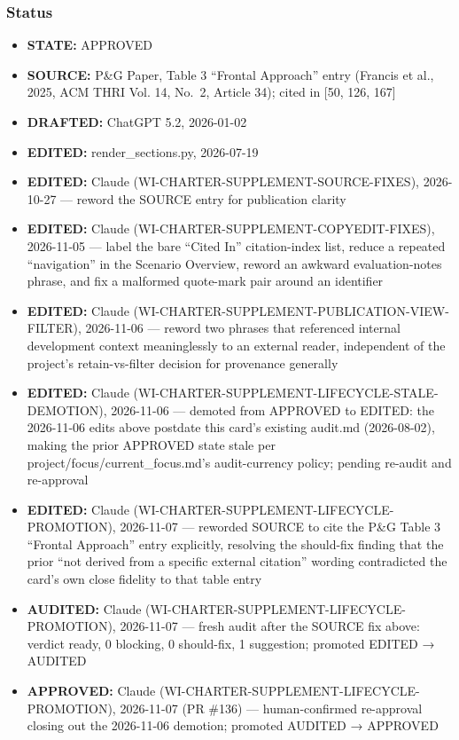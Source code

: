 \documentclass[utf8]{frontiers_suppmat} %
\providecommand{\tightlist}{%
  \setlength{\itemsep}{0pt}\setlength{\parskip}{0pt}}
\begin{document}
\subsubsection{Status}\label{status}

\begin{itemize}
\tightlist
\item
  \textbf{STATE:} APPROVED
\item
  \textbf{SOURCE:} P\&G Paper, Table 3 ``Frontal Approach'' entry
  (Francis et al., 2025, ACM THRI Vol. 14, No.~2, Article 34); cited in
  {[}50, 126, 167{]}
\item
  \textbf{DRAFTED:} ChatGPT 5.2, 2026-01-02
\item
  \textbf{EDITED:} render\_sections.py, 2026-07-19
\item
  \textbf{EDITED:} Claude (WI-CHARTER-SUPPLEMENT-SOURCE-FIXES),
  2026-10-27 --- reword the SOURCE entry for publication clarity
\item
  \textbf{EDITED:} Claude (WI-CHARTER-SUPPLEMENT-COPYEDIT-FIXES),
  2026-11-05 --- label the bare ``Cited In'' citation-index list, reduce
  a repeated ``navigation'' in the Scenario Overview, reword an awkward
  evaluation-notes phrase, and fix a malformed quote-mark pair around an
  identifier
\item
  \textbf{EDITED:} Claude
  (WI-CHARTER-SUPPLEMENT-PUBLICATION-VIEW-FILTER), 2026-11-06 --- reword
  two phrases that referenced internal development context meaninglessly
  to an external reader, independent of the project's retain-vs-filter
  decision for provenance generally
\item
  \textbf{EDITED:} Claude
  (WI-CHARTER-SUPPLEMENT-LIFECYCLE-STALE-DEMOTION), 2026-11-06 ---
  demoted from APPROVED to EDITED: the 2026-11-06 edits above postdate
  this card's existing audit.md (2026-08-02), making the prior APPROVED
  state stale per project/focus/current\_focus.md's audit-currency
  policy; pending re-audit and re-approval
\item
  \textbf{EDITED:} Claude (WI-CHARTER-SUPPLEMENT-LIFECYCLE-PROMOTION),
  2026-11-07 --- reworded SOURCE to cite the P\&G Table 3 ``Frontal
  Approach'' entry explicitly, resolving the should-fix finding that the
  prior ``not derived from a specific external citation'' wording
  contradicted the card's own close fidelity to that table entry
\item
  \textbf{AUDITED:} Claude (WI-CHARTER-SUPPLEMENT-LIFECYCLE-PROMOTION),
  2026-11-07 --- fresh audit after the SOURCE fix above: verdict ready,
  0 blocking, 0 should-fix, 1 suggestion; promoted EDITED → AUDITED
\item
  \textbf{APPROVED:} Claude (WI-CHARTER-SUPPLEMENT-LIFECYCLE-PROMOTION),
  2026-11-07 (PR \#136) --- human-confirmed re-approval closing out the
  2026-11-06 demotion; promoted AUDITED → APPROVED
\end{itemize}
\end{document}
